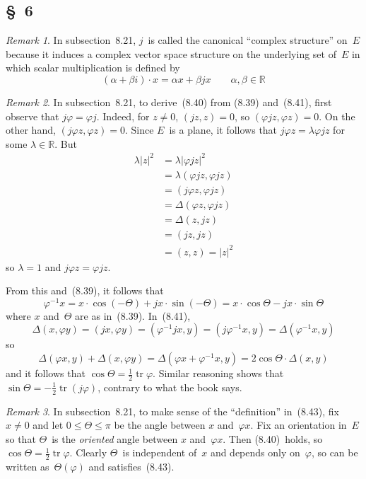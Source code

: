 \documentclass[letterpaper,12pt]{article}
\newcommand{\R}{\mathbb{R}}
\DeclareMathOperator{\tr}{tr}
\newcommand{\mult}{\cdot}
\newcommand{\iprod}[2]{(#1,#2)}
\newcommand{\norm}[1]{|#1|}
\theoremstyle{definition}
\theoremstyle{remark}
\newtheorem*{rmk}{Remark}
\begin{document}
\subsection*{\S~6}
\begin{rmk}
In subsection~8.21, \(j\)~is called the canonical ``complex structure'' on~\(E\) because it induces a complex vector space structure on the underlying set of~\(E\) in which scalar multiplication is defined by
\[(\alpha+\beta i)\mult x=\alpha x+\beta jx\qquad\alpha,\beta\in\R\]
\end{rmk}

\begin{rmk}
In subsection~8.21, to derive~(8.40) from (8.39) and~(8.41), first observe that \(j\varphi=\varphi j\). Indeed, for \(z\ne 0\), \(\iprod{jz}{z}=0\), so \(\iprod{\varphi jz}{\varphi z}=0\). On the other hand, \(\iprod{j\varphi z}{\varphi z}=0\). Since \(E\)~is a plane, it follows that \(j\varphi z=\lambda\varphi jz\) for some \(\lambda\in\R\). But
\begin{align*}
\lambda\norm{z}^2&=\lambda\norm{\varphi jz}^2\\
	&=\lambda\iprod{\varphi jz}{\varphi jz}\\
	&=\iprod{j\varphi z}{\varphi jz}\\
	&=\Delta(\varphi z,\varphi jz)\\
	&=\Delta(z,jz)\\
	&=\iprod{jz}{jz}\\
	&=\iprod{z}{z}=\norm{z}^2
\end{align*}
so \(\lambda=1\) and \(j\varphi z=\varphi j z\).

From this and~(8.39), it follows that
\[\varphi^{-1}x=x\mult\cos(-\Theta)+jx\mult\sin(-\Theta)=x\mult\cos\Theta-jx\mult\sin\Theta\]
where \(x\) and~\(\Theta\) are as in~(8.39). In~(8.41),
\[\Delta(x,\varphi y)=\iprod{jx}{\varphi y}=\iprod{\varphi^{-1}jx}{y}=\iprod{j\varphi^{-1}x}{y}=\Delta(\varphi^{-1}x,y)\]
so
\[\Delta(\varphi x,y)+\Delta(x,\varphi y)=\Delta(\varphi x+\varphi^{-1}x,y)=2\cos\Theta\mult\Delta(x,y)\]
and it follows that \(\cos\Theta=\tfrac{1}{2}\tr\varphi\). Similar reasoning shows that \(\sin\Theta=-\tfrac{1}{2}\tr(j\varphi)\), contrary to what the book says.
\end{rmk}

\begin{rmk}
In subsection~8.21, to make sense of the ``definition'' in~(8.43), fix \(x\ne 0\) and let \(0\le\Theta\le\pi\) be the angle between \(x\) and~\(\varphi x\). Fix an orientation in~\(E\) so that \(\Theta\)~is the \emph{oriented} angle between \(x\) and~\(\varphi x\). Then (8.40)~holds, so \(\cos\Theta=\tfrac{1}{2}\tr\varphi\). Clearly \(\Theta\)~is independent of~\(x\) and depends only on~\(\varphi\), so can be written as~\(\Theta(\varphi)\) and satisfies~(8.43).
\end{rmk}
\end{document}
